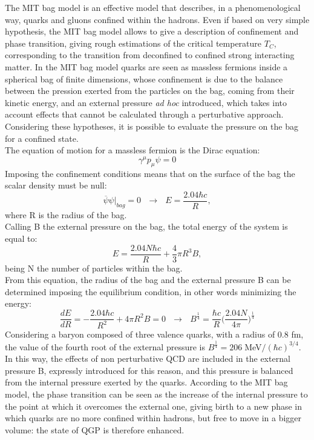 The MIT bag model is an effective model that describes, in a phenomenological way, quarks and gluons confined within the hadrons. Even if based on very simple hypothesis, the MIT bag model allows to give a description of confinement and phase transition, giving rough estimations of the critical temperature $T_{C}$, corresponding to the transition from deconfined to confined strong interacting matter. In the MIT bag model quarks are seen as massless fermions inside a spherical bag of finite dimensions, whose confinement is due to the balance between the pression exerted from the particles on the bag, coming from their kinetic energy, and an external pressure \textit{ad hoc} introduced, which takes into account effects that cannot be calculated through a perturbative approach. Considering these hypotheses, it is possible to evaluate the pressure on the bag for a confined state.\\
The equation of motion for a massless fermion is the Dirac equation:
%
\begin{equation}
  \gamma^{\mu}p_{\mu}\psi=0
\end{equation}
%
Imposing the confinement conditions means that on the surface of the bag the scalar density must be null:
%
\begin{equation}
  \overbar{\psi}\psi \Big|_{bag} = 0 \ \ \ \longrightarrow \ \ \ E = \frac{2.04 \hbar c}{R},
\end{equation}
%
where R is the radius of the bag.\\
Calling B the external pressure on the bag, the total energy of the system is equal to:
%
\begin{equation}
  E = \frac{2.04N \hbar c}{R} + \frac{4}{3} \pi R^{3} B,
\end{equation}
%
being N the number of particles within the bag.\\
From this equation, the radius of the bag and the external pressure B can be determined imposing the equilibrium condition, in other words minimizing the energy:
%
\begin{equation}
  \frac{dE}{dR} = -\frac{2.04 \hbar c}{R^{2}} + 4 \pi R^{2} B = 0 \ \ \ \longrightarrow \ \ \ B^{\frac{1}{4}} = \frac{\hbar c}{R}\Big(\frac{2.04N}{4\pi}\Big)^{\frac{1}{4}}
\end{equation}
%
Considering a baryon composed of three valence quarks, with a radius of 0.8 fm, the value of the fourth root of the external pressure is $B^{\frac{1}{4}} = 206 \; $MeV$ / (\hbar c)^{3/4}$. In this way, the effects of non perturbative QCD are included in the external pressure B, expressly introduced for this reason, and this pressure is balanced from the internal pressure exerted by the quarks. According to the MIT bag model, the phase transition can be seen as the increase of the internal pressure to the point at which it overcomes the external one, giving birth to a new phase in which quarks are no more confined within hadrons, but free to move in a bigger volume: the state of QGP is therefore enhanced.\\
